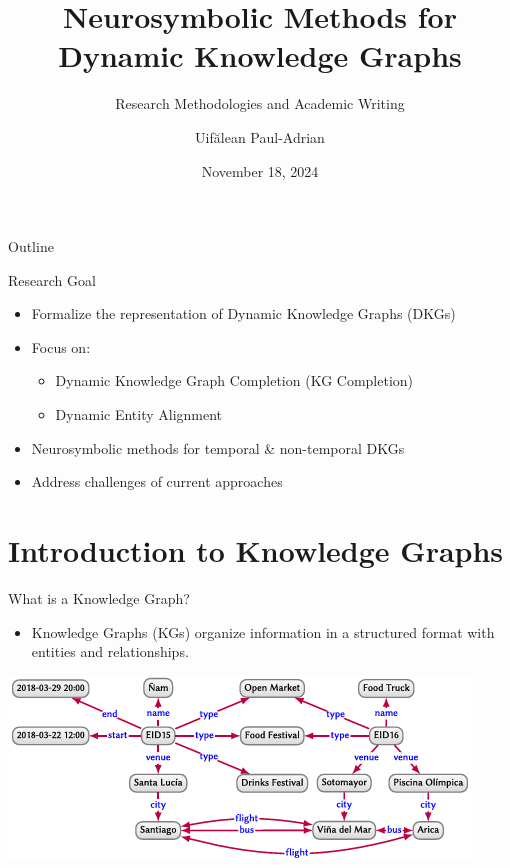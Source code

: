 \documentclass{beamer}
\title{Neurosymbolic Methods for Dynamic Knowledge Graphs}
\subtitle{Research Methodologies and Academic Writing}
\author{Uif\u{a}lean Paul-Adrian}
\institute{Babe\c{s}-Bolyai University}
\date{November 18, 2024}
\begin{document}
    \begin{frame}
        \titlepage
    \end{frame}

    \begin{frame}{Outline}
        \tableofcontents
    \end{frame}

    \begin{frame}{Research Goal}
        \begin{itemize}
            \item Formalize the representation of Dynamic Knowledge Graphs (DKGs)
            \item Focus on:
            \begin{itemize}
                \item Dynamic Knowledge Graph Completion (KG Completion)
                \item Dynamic Entity Alignment
            \end{itemize}
            \item Neurosymbolic methods for temporal \& non-temporal DKGs
            \item Address challenges of current approaches
        \end{itemize}
    \end{frame}

    
    \section{Introduction to Knowledge Graphs}
    
    \begin{frame}{What is a Knowledge Graph?}
        \begin{itemize}
            \item Knowledge Graphs (KGs) organize information in a structured format with entities and relationships.
        \end{itemize}
        
        \includegraphics[width=\textwidth]{img/KG.png}
    \end{frame}
\end{document}
